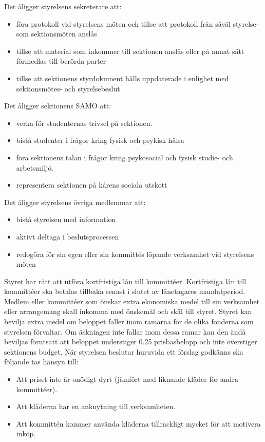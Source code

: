 \documentclass[a4paper]{dtek}
\newcommand{\prisbasbelopp}[1]{
    #1 prisbasbelopp
    \ifdef{\nuvarandeprisbasbelopp}{
        \marginpar{
            \small{ \textbf{\roundandprint{\xintiexpr#1 * \nuvarandeprisbasbelopp\relax}kr}}
        }
    }{}
}
\begin{document}
\para Det åligger styrelsens sekreterare att:
\begin{itemize}
  \item föra protokoll vid styrelsens möten och tillse att protokoll från såväl styrelse- som sektionsmöten anslås
  \item tillse att material som inkommer till sektionen anslås eller på annat sätt förmedlas till berörda parter
  \item tillse att sektionens styrdokument hålls uppdaterade i enlighet med sektionsmötes- och styrelsebeslut
\end{itemize}
\para Det åligger sektionens SAMO att:
\begin{itemize}
  \item verka för studenternas trivsel på sektionen.
  \item bistå studenter i frågor kring fysisk och psykisk hälsa
  \item föra sektionens talan i frågor kring psykosocial och fysisk studie- och arbetsmiljö.
  \item representera sektionen på kårens sociala utskott
\end{itemize}
\para Det åligger styrelsens övriga medlemmar att:
\begin{itemize}
  \item bistå styrelsen med information
  \item aktivt deltaga i beslutsprocessen
  \item redogöra för sin egen eller sin kommittés löpande verksamhet vid styrelsens möten
\end{itemize}
\para [Ekonomi] Styret har rätt att utföra kortfristiga lån till kommittéer.
\para Kortfristiga lån till kommittéer ska betalas tillbaka senast i slutet av lånetagares mandatperiod.
\para Medlem eller kommittéer som önskar extra ekonomiska medel till sin verksamhet eller arrangemang skall inkomma med önskemål och skäl till styret.
\stycke Styret kan bevilja extra medel om beloppet faller inom ramarna för de olika fonderna som styrelsen förvaltar.
\stycke Om äskningen inte fallar inom dessa ramar kan den ändå beviljas förutsatt att beloppet understiger \prisbasbelopp{0.25} och inte överstiger sektionens budget.
\para När styrelsen beslutar huruvida ett förslag godkänns ska följande tas hänsyn till:
\begin{itemize}
    \item Att priset inte är onödigt dyrt (jämfört med liknande kläder för andra kommittéer).
    \item Att kläderna har en anknytning till verksamheten.
    \item Att kommittén kommer använda kläderna tillräckligt mycket för att motivera inköp.
\end{itemize}
\end{document}
